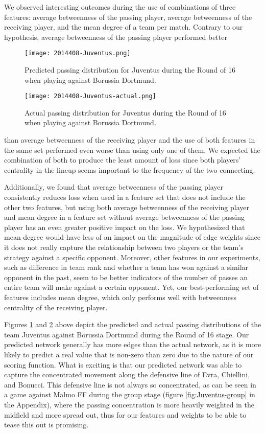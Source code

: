 \documentclass[11pt,letterpaper]{article}
\begin{document}
We observed interesting outcomes during the use of combinations of three features: average betweenness of the passing player, average betweenness of the receiving player, and the mean degree of a team per match. Contrary to our hypothesis,  average betweenness of the passing player performed better 

\begin{figure}[h]
\caption{Predicted passing distribution for Juventus during the Round of 16 when playing against Borussia Dortmund.}
\centering
\texttt{[image: 2014408-Juventus.png]}
\label{fig:Juventus-pred}
\end{figure}

\begin{figure}[h]
\caption{Actual passing distribution for Juventus during the Round of 16 when playing against Borussia Dortmund.}
\centering
\texttt{[image: 2014408-Juventus-actual.png]}
\label{fig:Juventus-actual}
\end{figure}

than average betweenness of the receiving player and the use of both features in the same set performed even worse than using only one of them.  We expected the combination of both to produce the least amount of loss since both players' centrality in the lineup seems important to the frequency of the two connecting.

Additionally, we found that average betweenness of the passing player consistently reduces loss when used in a feature set that does not include the other two features, but using both average betweenness of the receiving player and mean degree in a feature set without average betweenness of the passing player has an even greater positive impact on the loss. We hypothesized that mean degree would have less of an impact on the magnitude of edge weights since it does not really capture the relationship between two players or the team's strategy against a specific opponent. Moreover, other features in our experiments, such as difference in team rank and whether a team has won against a similar opponent in the past, seem to be better indicators of the number of passes an entire team will make against a certain opponent.  Yet, our best-performing set of features includes mean degree, which only performs well with betweenness centrality of the receiving player.

Figures \ref{fig:Juventus-pred} and \ref{fig:Juventus-actual} above depict the predicted and actual passing distributions of the team Juventus against Borussia Dortmund during the Round of 16 stage. Our predicted network generally has more edges than the actual network, as it is more likely to predict a real value that is non-zero than zero due to the nature of our scoring function. What is exciting is that our predicted network was able to capture the concentrated movement along the defensive line of Evra, Chiellini, and Bonucci. This defensive line is not always so concentrated, as can be seen in a game against Malmo FF during the group stage (figure \ref{fig:Juventus-group} in the Appendix), where the passing concentration is more heavily weighted in the midfield and more spread out, thus for our features and weights to be able to tease this out is promising.
\end{document}
